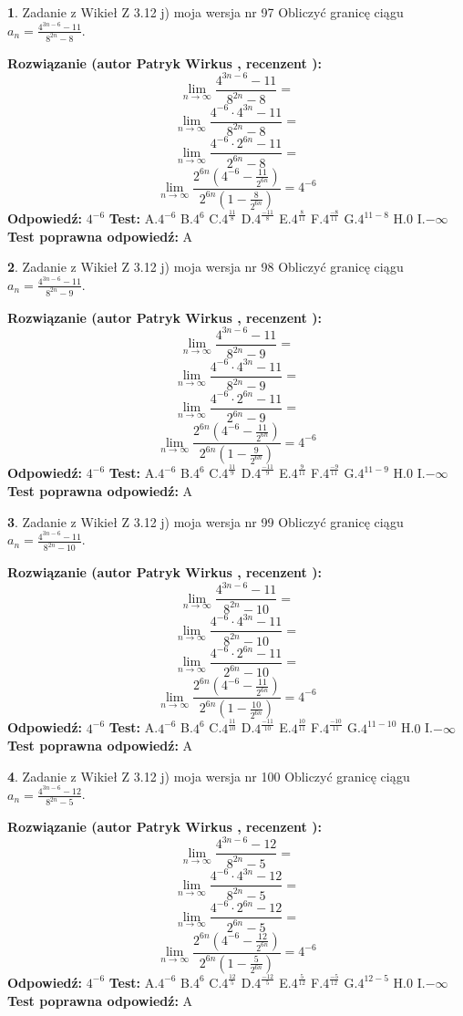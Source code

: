 \documentclass[12pt, a4paper]{article}
\theoremstyle{definition} %
\newtheorem{zad}{}
\newcommand{\zadStart}[1]{\begin{zad}#1\newline}
\newcommand{\zadStop}{\end{zad}}
\newcommand{\rozwStart}[2]{\noindent \textbf{Rozwiązanie (autor #1 , recenzent #2): }\newline}
\newcommand{\rozwStop}{\newline}
\newcommand{\odpStart}{\noindent \textbf{Odpowiedź:}\newline}
\newcommand{\odpStop}{\newline}
\newcommand{\testStart}{\noindent \textbf{Test:}\newline}
\newcommand{\testStop}{\newline}
\newcommand{\kluczStart}{\noindent \textbf{Test poprawna odpowiedź:}\newline}
\newcommand{\kluczStop}{\newline}
\begin{document}
\zadStart{Zadanie z Wikieł Z 3.12 j) moja wersja nr 97}
Obliczyć granicę ciągu $a_{n}=\frac{4^{3n-6}-11}{8^{2n}-8}$.
\zadStop
\rozwStart{Patryk Wirkus}{}
$$\lim\limits_{n\to\infty}\frac{4^{3n-6}-11}{8^{2n}-8}=$$
$$\lim\limits_{n\to\infty}\frac{4^{-6} \cdot 4^{3n}-11}{8^{2n}-8}=$$
$$\lim\limits_{n\to\infty}\frac{4^{-6} \cdot 2^{6n}-11}{2^{6n}-8}=$$
$$\lim\limits_{n\to\infty}\frac{2^{6n}(4^{-6} - \frac{11}{2^{6n}})}{2^{6n}(1-\frac{8}{2^{6n}})}= 4^{-6}$$
\rozwStop
\odpStart
$4^{-6}$
\odpStop
\testStart
A.$4^{-6}$
B.$4^{6}$
C.$4^{\frac{11}{8}}$
D.$4^{\frac{-11}{8}}$
E.$4^{\frac{8}{11}}$
F.$4^{\frac{-8}{11}}$
G.$4^{11-8}$
H.$0$
I.$-\infty$
\testStop
\kluczStart
A
\kluczStop



\zadStart{Zadanie z Wikieł Z 3.12 j) moja wersja nr 98}
Obliczyć granicę ciągu $a_{n}=\frac{4^{3n-6}-11}{8^{2n}-9}$.
\zadStop
\rozwStart{Patryk Wirkus}{}
$$\lim\limits_{n\to\infty}\frac{4^{3n-6}-11}{8^{2n}-9}=$$
$$\lim\limits_{n\to\infty}\frac{4^{-6} \cdot 4^{3n}-11}{8^{2n}-9}=$$
$$\lim\limits_{n\to\infty}\frac{4^{-6} \cdot 2^{6n}-11}{2^{6n}-9}=$$
$$\lim\limits_{n\to\infty}\frac{2^{6n}(4^{-6} - \frac{11}{2^{6n}})}{2^{6n}(1-\frac{9}{2^{6n}})}= 4^{-6}$$
\rozwStop
\odpStart
$4^{-6}$
\odpStop
\testStart
A.$4^{-6}$
B.$4^{6}$
C.$4^{\frac{11}{9}}$
D.$4^{\frac{-11}{9}}$
E.$4^{\frac{9}{11}}$
F.$4^{\frac{-9}{11}}$
G.$4^{11-9}$
H.$0$
I.$-\infty$
\testStop
\kluczStart
A
\kluczStop



\zadStart{Zadanie z Wikieł Z 3.12 j) moja wersja nr 99}
Obliczyć granicę ciągu $a_{n}=\frac{4^{3n-6}-11}{8^{2n}-10}$.
\zadStop
\rozwStart{Patryk Wirkus}{}
$$\lim\limits_{n\to\infty}\frac{4^{3n-6}-11}{8^{2n}-10}=$$
$$\lim\limits_{n\to\infty}\frac{4^{-6} \cdot 4^{3n}-11}{8^{2n}-10}=$$
$$\lim\limits_{n\to\infty}\frac{4^{-6} \cdot 2^{6n}-11}{2^{6n}-10}=$$
$$\lim\limits_{n\to\infty}\frac{2^{6n}(4^{-6} - \frac{11}{2^{6n}})}{2^{6n}(1-\frac{10}{2^{6n}})}= 4^{-6}$$
\rozwStop
\odpStart
$4^{-6}$
\odpStop
\testStart
A.$4^{-6}$
B.$4^{6}$
C.$4^{\frac{11}{10}}$
D.$4^{\frac{-11}{10}}$
E.$4^{\frac{10}{11}}$
F.$4^{\frac{-10}{11}}$
G.$4^{11-10}$
H.$0$
I.$-\infty$
\testStop
\kluczStart
A
\kluczStop



\zadStart{Zadanie z Wikieł Z 3.12 j) moja wersja nr 100}
Obliczyć granicę ciągu $a_{n}=\frac{4^{3n-6}-12}{8^{2n}-5}$.
\zadStop
\rozwStart{Patryk Wirkus}{}
$$\lim\limits_{n\to\infty}\frac{4^{3n-6}-12}{8^{2n}-5}=$$
$$\lim\limits_{n\to\infty}\frac{4^{-6} \cdot 4^{3n}-12}{8^{2n}-5}=$$
$$\lim\limits_{n\to\infty}\frac{4^{-6} \cdot 2^{6n}-12}{2^{6n}-5}=$$
$$\lim\limits_{n\to\infty}\frac{2^{6n}(4^{-6} - \frac{12}{2^{6n}})}{2^{6n}(1-\frac{5}{2^{6n}})}= 4^{-6}$$
\rozwStop
\odpStart
$4^{-6}$
\odpStop
\testStart
A.$4^{-6}$
B.$4^{6}$
C.$4^{\frac{12}{5}}$
D.$4^{\frac{-12}{5}}$
E.$4^{\frac{5}{12}}$
F.$4^{\frac{-5}{12}}$
G.$4^{12-5}$
H.$0$
I.$-\infty$
\testStop
\kluczStart
A
\kluczStop
\end{document}
